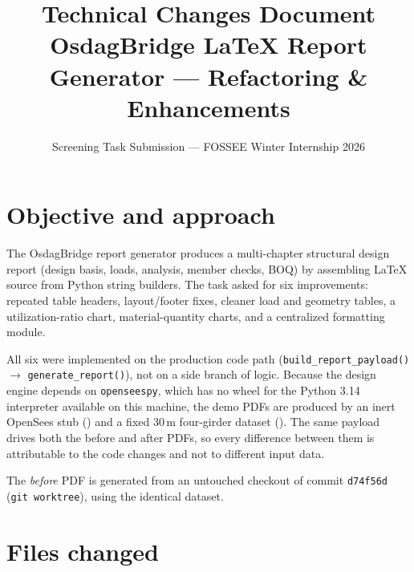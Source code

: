 \documentclass[11pt,a4paper]{article}
\title{\vspace{-1.2cm}\textbf{Technical Changes Document}\\[2pt]
\large OsdagBridge LaTeX Report Generator --- Refactoring \& Enhancements}
\author{Screening Task Submission --- FOSSEE Winter Internship 2026}
\date{}
\newcommand{\code}[1]{\texttt{\small #1}}
\begin{document}
\maketitle
\vspace{-0.6cm}

\section{Objective and approach}

The OsdagBridge report generator produces a multi-chapter structural design report
(design basis, loads, analysis, member checks, BOQ) by assembling LaTeX source from
Python string builders. The task asked for six improvements: repeated table headers,
layout/footer fixes, cleaner load and geometry tables, a utilization-ratio chart,
material-quantity charts, and a centralized formatting module.

All six were implemented on the production code path
(\code{build\_report\_payload()} $\rightarrow$ \code{generate\_report()}), not on a
side branch of logic. Because the design engine depends on \code{openseespy}, which
has no wheel for the Python 3.14 interpreter available on this machine, the demo
PDFs are produced by an inert OpenSees stub
() and a fixed 30\,m four-girder
dataset (). The same payload drives both the
before and after PDFs, so every difference between them is attributable to the code
changes and not to different input data.

The \emph{before} PDF is generated from an untouched checkout of commit
\code{d74f56d} (\code{git worktree}), using the identical dataset.

\section{Files changed}
\end{document}
